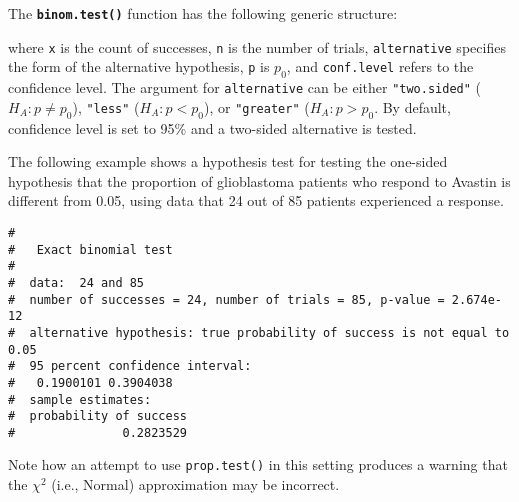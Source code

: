 \documentclass[letterpaper,12pt,twoside,]{pinp}
\begin{document}
The \textbf{\texttt{binom.test()}} function has the following generic
structure:

\begin{Shaded}
\begin{Highlighting}[]
 \NormalTok{, } \NormalTok{, } \NormalTok{)}
\end{Highlighting}
\end{Shaded}

where \texttt{x} is the count of successes, \texttt{n} is the number of
trials, \texttt{alternative} specifies the form of the alternative
hypothesis, \texttt{p} is \(p_0\), and \texttt{conf.level} refers to the
confidence level. The argument for \texttt{alternative} can be either
\texttt{"two.sided"} (\(H_A: p \neq p_0\)), \texttt{"less"}
(\(H_A: p < p_0\)), or \texttt{"greater"} (\(H_A: p > p_0\). By default,
confidence level is set to 95\% and a two-sided alternative is tested.

The following example shows a hypothesis test for testing the one-sided
hypothesis that the proportion of glioblastoma patients who respond to
Avastin is different from 0.05, using data that 24 out of 85 patients
experienced a response.

\begin{Shaded}
\begin{Highlighting}[]
\NormalTok{(} \NormalTok{, } \NormalTok{, } \NormalTok{, } \NormalTok{, } \NormalTok{)}
\end{Highlighting}
\end{Shaded}

\begin{ShadedResult}
\begin{verbatim}
#  
#   Exact binomial test
#  
#  data:  24 and 85
#  number of successes = 24, number of trials = 85, p-value = 2.674e-12
#  alternative hypothesis: true probability of success is not equal to 0.05
#  95 percent confidence interval:
#   0.1900101 0.3904038
#  sample estimates:
#  probability of success 
#               0.2823529
\end{verbatim}
\end{ShadedResult}

Note how an attempt to use \texttt{prop.test()} in this setting produces
a warning that the \(\chi^2\) (i.e., Normal) approximation may be
incorrect.
\end{document}
